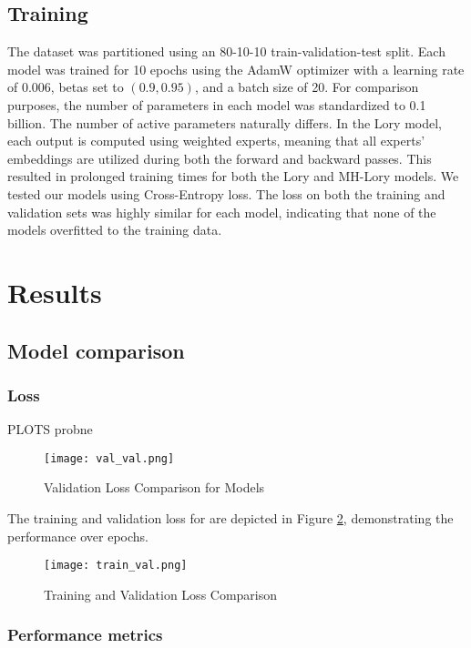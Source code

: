 \documentclass[12pt]{article}
\begin{document}
\subsection{Training} 
The dataset was partitioned using an 80-10-10 train-validation-test split. Each model was trained for 10 epochs using the AdamW optimizer with a learning rate of $0.006$, betas set to $(0.9, 0.95)$, and a batch size of 20. For comparison purposes, the number of parameters in each model was standardized to 0.1 billion. The number of active parameters naturally differs. In the Lory model, each output is computed using weighted experts, meaning that all experts' embeddings are utilized during both the forward and backward passes. This resulted in prolonged training times for both the Lory and MH-Lory models. 
We tested our models using Cross-Entropy loss. The loss on both the training and validation sets was highly similar for each model, indicating that none of the models overfitted to the training data. 


\section{Results}

\subsection{Model comparison}
\subsubsection{Loss}
 PLOTS probne

\begin{figure}[H]
    \centering
    \texttt{[image: val\_val.png]}
    \caption{Validation Loss Comparison for Models}
    \label{fig:validation_loss}
\end{figure}

The training and validation loss for are depicted in Figure \ref{fig:train_val_loss}, demonstrating the performance over epochs.

\begin{figure}[H]
    \centering
    \texttt{[image: train\_val.png]}
    \caption{Training and Validation Loss Comparison}
    \label{fig:train_val_loss}
\end{figure}

\subsubsection{Performance metrics}
\end{document}
